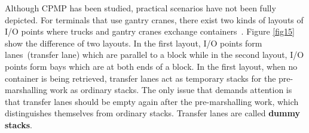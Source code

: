 \documentclass[review,3p,times,authoryear,12pt]{elsarticle}
\begin{document}
Although CPMP has been studied, practical scenarios have not been fully depicted. For terminals that use gantry cranes, there exist two kinds of layouts of I/O points where trucks and gantry cranes exchange containers~\cite{Carlo2014}. Figure \ref{fig15} show the difference of two layouts. In the first layout, I/O points form lanes~(transfer lane) which are parallel to a block while in the second layout, I/O points form bays which are at both ends of a block. In the first layout, when no container is being retrieved, transfer lanes act as temporary stacks for the pre-marshalling work as ordinary stacks. The only issue that demands attention is that transfer lanes should be empty again after the pre-marshalling work, which distinguishes themselves from ordinary stacks. Transfer lanes are called \textbf{dummy stacks}.
\end{document}
